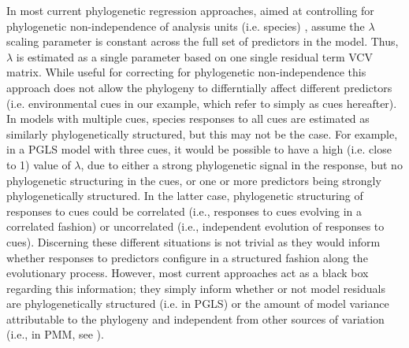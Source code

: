 \documentclass{article}\usepackage[]{graphicx}\usepackage[]{color}
\begin{document}
In most current phylogenetic regression approaches, aimed at controlling for phylogenetic non-independence of analysis units (i.e. species) \citep[see][]{revell2010phylogenetic}, assume the $\lambda$ scaling parameter is constant across the full set of predictors in the model. Thus, $\lambda$ is estimated as a single parameter based on one single residual term VCV matrix. While useful for correcting for phylogenetic non-independence this approach does not allow the phylogeny to differntially affect different predictors (i.e. environmental cues in our example, which refer to simply as cues hereafter). In models with multiple cues, species responses to all cues are estimated as similarly phylogenetically structured, but this may not be the case. For example, in a PGLS model with three cues, it would be possible to have a high (i.e. close to 1) value of $\lambda$, due to either a strong phylogenetic signal in the response, but no phylogenetic structuring in the cues, or one or more predictors being strongly phylogenetically structured. In the latter case, phylogenetic structuring of responses to cues could be correlated (i.e., responses to cues evolving in a correlated fashion) or uncorrelated (i.e., independent evolution of responses to cues). Discerning these different situations is not trivial as they would inform whether responses to predictors configure in a structured fashion along the evolutionary process. However, most current approaches act as a black box regarding this information; they simply inform whether or not model residuals are phylogenetically structured (i.e. in PGLS) or the amount of model variance attributable to the phylogeny and independent from other sources of variation (i.e., in PMM, see \cite{housworth2004phylogenetic}).\\
\end{document}
